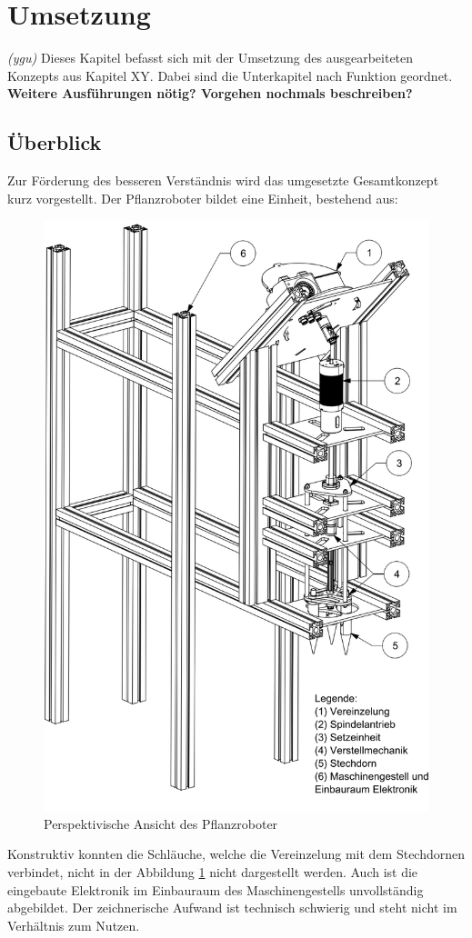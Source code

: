 \newpage
\section{Umsetzung} 
\label{kap:Umsetzung}
\textit{(ygu)} Dieses Kapitel befasst sich mit der Umsetzung des ausgearbeiteten Konzepts aus Kapitel XY. Dabei sind die Unterkapitel nach Funktion geordnet. \textbf{Weitere Ausführungen nötig? Vorgehen nochmals beschreiben?}
\newpage
\subsection{Überblick}
Zur Förderung des besseren Verständnis wird das umgesetzte Gesamtkonzept kurz vorgestellt.  Der Pflanzroboter bildet eine Einheit, bestehend aus:
	\begin{figure}[H]
	\includegraphics[scale=0.45]{Illustrationen/6-Umsetzung/uberblick.png}
	\caption{Perspektivische Ansicht des Pflanzroboter}
	\label{fig:uberblick}
	\end{figure}
Konstruktiv konnten die Schläuche, welche die Vereinzelung mit dem Stechdornen verbindet, nicht in der Abbildung \ref{fig:uberblick} nicht dargestellt werden. Auch ist die eingebaute Elektronik im Einbauraum des Maschinengestells unvollständig abgebildet. Der zeichnerische Aufwand ist technisch schwierig und steht nicht im Verhältnis zum Nutzen. 
